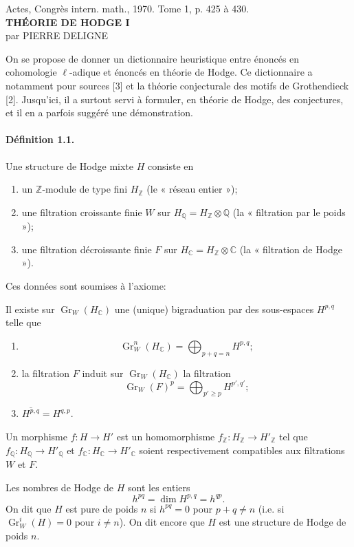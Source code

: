 \documentclass[10pt]{article}
\newcommand{\C}{\mathbb C}
\newcommand{\Q}{\mathbb Q}
\newcommand{\Z}{\mathbb Z}
\newcommand{\Gr}{\operatorname{Gr}}
\begin{document}
\begin{center}
{\small Actes, Congrès intern. math., 1970. Tome 1, p. 425 à 430.}\\[4em]
{\Large\bfseries THÉORIE DE HODGE I}\\[1.6em]
{\large par PIERRE DELIGNE}
\end{center}

On se propose de donner un dictionnaire heuristique entre énoncés en cohomologie $\ell$-adique et énoncés en théorie de Hodge. Ce dictionnaire a notamment pour sources [3] et la théorie conjecturale des motifs de Grothendieck [2]. Jusqu'ici, il a surtout servi à formuler, en théorie de Hodge, des conjectures, et il en a parfois suggéré une démonstration.

\paragraph{Définition 1.1.} Une structure de Hodge mixte $H$ consiste en
\begin{enumerate}[label=(\alph*)]
\item un $\Z$-module de type fini $H_\Z$ (le « réseau entier »);
\item une filtration croissante finie $W$ sur $H_\Q=H_\Z\otimes\Q$ (la « filtration par le poids »);
\item une filtration décroissante finie $F$ sur $H_\C=H_\Z\otimes\C$ (la « filtration de Hodge »).
\end{enumerate}
Ces données sont soumises à l'axiome:

Il existe sur $\Gr_W(H_\C)$ une (unique) bigraduation par des sous-espaces $H^{p,q}$ telle que
\begin{enumerate}[label=(\roman*)]
\item
\[
\Gr_W^n(H_\C)=\bigoplus_{p+q=n}H^{p,q};
\]
\item la filtration $F$ induit sur $\Gr_W(H_\C)$ la filtration
\[
\Gr_W(F)^p=\bigoplus_{p'\ge p}H^{p',q'};
\]
\item $\overline{H^{p,q}}=H^{q,p}$.
\end{enumerate}
Un morphisme $f:H\to H'$ est un homomorphisme $f_\Z:H_\Z\to H'_\Z$ tel que $f_\Q:H_\Q\to H'_\Q$ et $f_\C:H_\C\to H'_\C$ soient respectivement compatibles aux filtrations $W$ et $F$.

Les nombres de Hodge de $H$ sont les entiers
\[
\tag{1.2}
h^{pq}=\dim H^{p,q}=h^{qp}.
\]
On dit que $H$ est pure de poids $n$ si $h^{pq}=0$ pour $p+q\ne n$ (i.e. si $\Gr_W^i(H)=0$ pour $i\ne n$). On dit encore que $H$ est une structure de Hodge de poids $n$.
\end{document}

